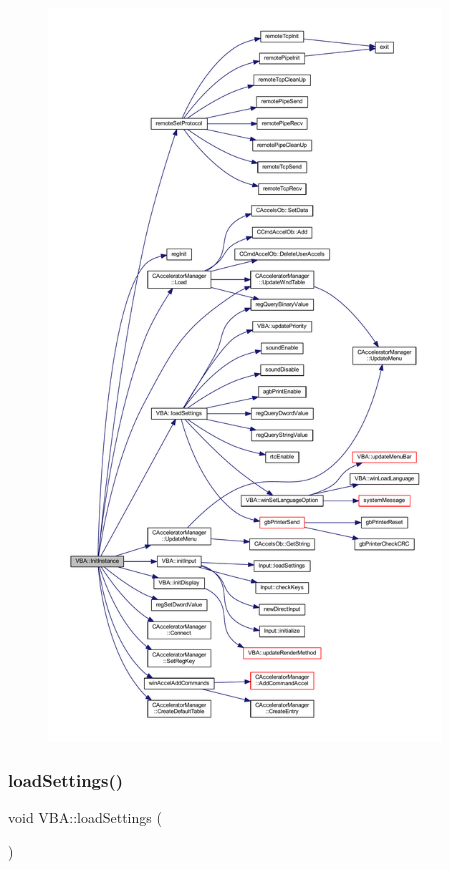 \begin{figure}[H]
\begin{center}
\leavevmode
\includegraphics[height=550pt]{class_v_b_a_a35c73ff552824e3eba6e90393a4692d4_cgraph}
\end{center}
\end{figure}
\mbox{\label{class_v_b_a_aed48a7db8cc5b65a1e495661f6040915}} 
\subsubsection{\texorpdfstring{load\+Settings()}{loadSettings()}}
{\footnotesize\ttfamily void V\+B\+A\+::load\+Settings (\begin{DoxyParamCaption}{ }\end{DoxyParamCaption})}



